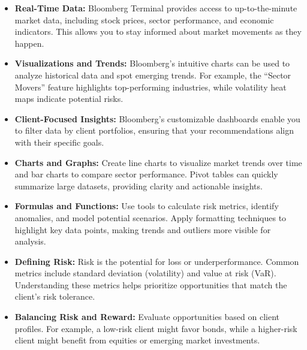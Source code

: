 \documentclass[11pt]{article}
\begin{document}
\begin{itemize}[leftmargin=1.5em, itemsep=2pt]
  \item \textbf{Real-Time Data:} Bloomberg Terminal provides access to
  up-to-the-minute market data, including stock prices, sector performance,
  and economic indicators. This allows you to stay informed about market
  movements as they happen.
  \item \textbf{Visualizations and Trends:} Bloomberg's intuitive charts can
  be used to analyze historical data and spot emerging trends. For example,
  the ``Sector Movers'' feature highlights top-performing industries, while
  volatility heat maps indicate potential risks.
  \item \textbf{Client-Focused Insights:} Bloomberg's customizable dashboards
  enable you to filter data by client portfolios, ensuring that your
  recommendations align with their specific goals.
\end{itemize}

\begin{itemize}[leftmargin=1.5em, itemsep=2pt]
  \item \textbf{Charts and Graphs:} Create line charts to visualize market
  trends over time and bar charts to compare sector performance. Pivot tables
  can quickly summarize large datasets, providing clarity and actionable
  insights.
  \item \textbf{Formulas and Functions:} Use tools to calculate risk metrics,
  identify anomalies, and model potential scenarios. Apply formatting
  techniques to highlight key data points, making trends and outliers more
  visible for analysis.
\end{itemize}

\begin{itemize}[leftmargin=1.5em, itemsep=2pt]
  \item \textbf{Defining Risk:} Risk is the potential for loss or
  underperformance. Common metrics include standard deviation (volatility)
  and value at risk (VaR). Understanding these metrics helps prioritize
  opportunities that match the client's risk tolerance.
  \item \textbf{Balancing Risk and Reward:} Evaluate opportunities based on
  client profiles. For example, a low-risk client might favor bonds, while a
  higher-risk client might benefit from equities or emerging market
  investments.
\end{itemize}
\end{document}
